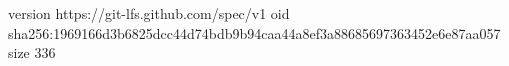 version https://git-lfs.github.com/spec/v1
oid sha256:1969166d3b6825dcc44d74bdb9b94caa44a8ef3a88685697363452e6e87aa057
size 336
